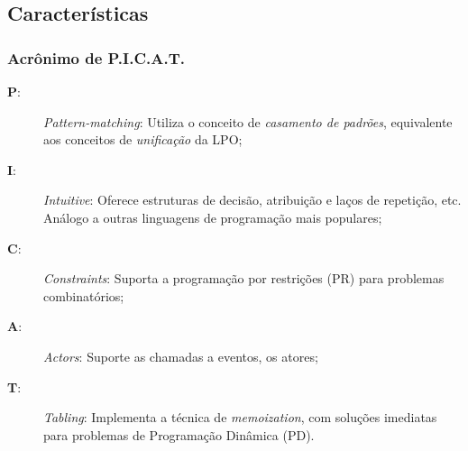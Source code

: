 \subsection{Características}
\begin{frame}			  [allowframebreaks=0.95]
    \frametitle{Acrônimo de \textbf{P.I.C.A.T.}}
  
  	\begin{description}
   
 
      \item [\textbf{P}:] \textit{Pattern-matching}:  Utiliza o conceito de \textit{casamento de 
      padrões}, equivalente aos conceitos de \textit{unificação} da LPO;

      \item [\textbf{I}:] \textit{Intuitive}: Oferece estruturas de decisão, atribuição e laços de
      repetição, etc. Análogo a outras linguagens de programação mais populares;

      \item [\textbf{C}:] \textit{Constraints}: Suporta a programação por restrições (PR) para 	
      problemas combinatórios;

       \item [\textbf{A}:] \textit{Actors}: Suporte as chamadas a eventos, os atores;

      \item [\textbf{T}:] \textit{Tabling}: Implementa a técnica de \textit{memoization}, com 
      soluções imediatas para problemas de Programação Dinâmica (PD).
   
  
  \end{description}	
\end{frame}


